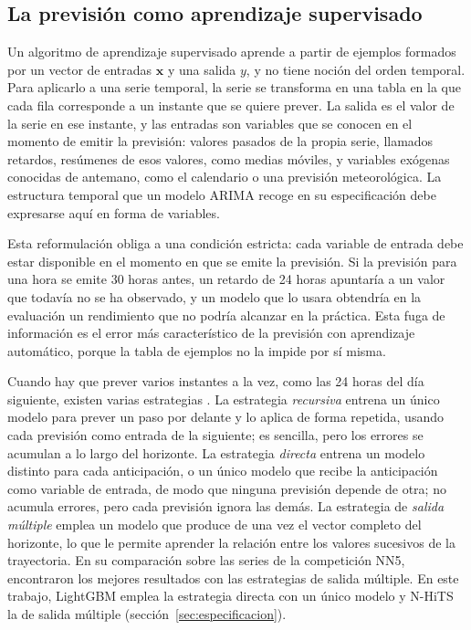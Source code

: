\subsection{La previsión como aprendizaje supervisado}\label{sec:ml-supervisado}

Un algoritmo de aprendizaje supervisado aprende a partir de ejemplos
formados por un vector de entradas $\mathbf{x}$ y una salida $y$, y no tiene
noción del orden temporal. Para aplicarlo a una serie temporal, la serie se
transforma en una tabla en la que cada fila corresponde a un instante que se
quiere prever. La salida es el valor de la serie en ese instante, y las
entradas son variables que se conocen en el momento de emitir la previsión:
valores pasados de la propia serie, llamados retardos, resúmenes de esos
valores, como medias móviles, y variables exógenas conocidas de antemano,
como el calendario o una previsión meteorológica. La estructura temporal que
un modelo ARIMA recoge en su especificación debe expresarse aquí en forma de
variables.

Esta reformulación obliga a una condición estricta: cada variable de entrada
debe estar disponible en el momento en que se emite la previsión. Si la
previsión para una hora se emite 30 horas antes, un retardo de 24 horas
apuntaría a un valor que todavía no se ha observado, y un modelo que lo usara
obtendría en la evaluación un rendimiento que no podría alcanzar en la
práctica. Esta fuga de información es el error más característico de la
previsión con aprendizaje automático, porque la tabla de ejemplos no la
impide por sí misma.

Cuando hay que prever varios instantes a la vez, como las 24 horas del día
siguiente, existen varias estrategias \parencite{bentaieb2012review}. La
estrategia \emph{recursiva} entrena un único modelo para prever un paso por
delante y lo aplica de forma repetida, usando cada previsión como entrada de
la siguiente; es sencilla, pero los errores se acumulan a lo largo del
horizonte. La estrategia \emph{directa} entrena un modelo distinto para cada
anticipación, o un único modelo que recibe la anticipación como variable de
entrada, de modo que ninguna previsión depende de otra; no acumula errores,
pero cada previsión ignora las demás. La estrategia de \emph{salida múltiple}
emplea un modelo que produce de una vez el vector completo del horizonte, lo
que le permite aprender la relación entre los valores sucesivos de la
trayectoria. En su comparación sobre las series de la competición NN5,
\textcite{bentaieb2012review} encontraron los mejores resultados con las
estrategias de salida múltiple. En este
trabajo, LightGBM emplea la estrategia directa con un único modelo y N-HiTS
la de salida múltiple (sección~\ref{sec:especificacion}).


